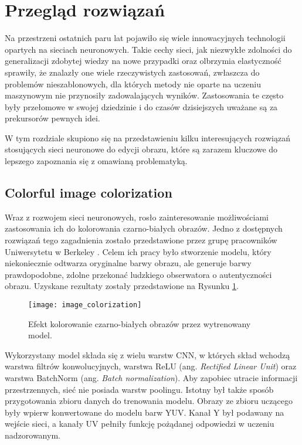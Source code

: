 \section[Przegląd rozwiązań (Bartosz Bieliński)]{Przegląd rozwiązań}

  Na przestrzeni ostatnich paru lat pojawiło się wiele innowacyjnych technologii opartych
  na sieciach neuronowych. Takie cechy sieci, jak niezwykłe zdolności do generalizacji
  zdobytej wiedzy na nowe przypadki oraz olbrzymia elastyczność sprawiły, że
  znalazły one wiele rzeczywistych zastosowań, zwłaszcza do problemów
  nieszablonowych, dla których metody nie oparte na uczeniu maszynowym
  nie przynosiły zadowalających wyników. Zastosowania te często były
  przełomowe w swojej dziedzinie i do czasów dzisiejszych uważane są
  za prekursorów pewnych idei.

  W tym rozdziale skupiono się na przedstawieniu kilku interesujących rozwiązań
  stosujących sieci neuronowe do edycji obrazu, które są zarazem kluczowe do lepszego
  zapoznania się z omawianą problematyką.

  \subsection{Colorful image colorization}

    Wraz z rozwojem sieci neuronowych, rosło zainteresowanie możliwościami zastosowania
    ich do kolorowania czarno-białych obrazów. Jedno z dostępnych rozwiązań tego
    zagadnienia zostało przedstawione przez grupę pracowników Uniwersytetu w
    Berkeley \cite{colorful_image_colorization}. Celem ich pracy było stworzenie
    modelu, który niekoniecznie odtwarza oryginalne barwy obrazu, ale generuje
    barwy prawdopodobne, zdolne przekonać ludzkiego obserwatora o autentyczności
    obrazu. Uzyskane rezultaty zostały przedstawione na
    Rysunku \ref{fig:colorful_image_colorization}.

    \begin{figure}[ht]
      \centering
      \texttt{[image: image\_colorization]}
      \caption[Efekt kolorowanie czarno-białych obrazów przez wytrenowany model - źródło:
      \cite{colorful_image_colorization}]{Efekt kolorowanie czarno-białych obrazów przez wytrenowany model.}
      \label{fig:colorful_image_colorization}
    \end{figure}

    Wykorzystany model składa się z wielu warstw CNN, w których skład wchodzą
    warstwa filtrów konwolucyjnych, warstwa ReLU (ang. \textit{Rectified
    Linear Unit}) oraz warstwa BatchNorm (ang. \textit{Batch normalization}).
    Aby zapobiec utracie informacji przestrzennych, sieć nie posiada warstw poolingu.
    Istotny był także sposób
    przygotowania zbioru danych do trenowania modelu. Obrazy ze zbioru uczącego
    były wpierw konwertowane do modelu barw YUV. Kanał Y był podawany na
    wejście sieci, a kanały UV pełniły funkcję pożądanej odpowiedzi w uczeniu
    nadzorowanym.

